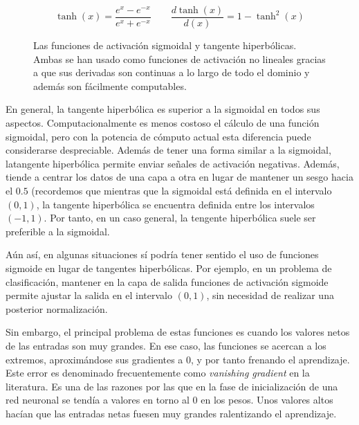 \begin{equation}
\tanh(x) = \frac{e^x - e^{-x}}{e^x+e^{-x}} \qquad
\frac{d\tanh (x)}{d(x)} = 1 - \tanh^2(x)
\label{eq:tanh}
\end{equation}

\begin{figure}[!b]
	\centering
	\qquad
	\caption[Funciones de activación: sigmoide y tangente hiperbólica]{Las funciones de activación sigmoidal y tangente hiperbólicas. Ambas se han usado como funciones de activación no lineales gracias a que sus derivadas son continuas a lo largo de todo el dominio y además son fácilmente computables.}
	\label{fig:sig-and-tanh}
\end{figure}

En general, la tangente hiperbólica es superior a la sigmoidal en todos sus aspectos. Computacionalmente es menos costoso el cálculo de una función sigmoidal, pero con la potencia de cómputo actual esta diferencia puede considerarse despreciable. Además de tener una forma similar a la sigmoidal, latangente hiperbólica permite enviar señales de activación negativas. Además, tiende a centrar los datos de una capa a otra en lugar de mantener un sesgo hacia el $0.5$ (recordemos que mientras que la sigmoidal está definida en el intervalo $(0, 1)$, la tangente hiperbólica se encuentra definida entre los intervalos $(-1, 1)$. Por tanto, en un caso general, la tengente hiperbólica suele ser preferible a la sigmoidal.

Aún así, en algunas situaciones sí podría tener sentido el uso de funciones sigmoide en lugar de tangentes hiperbólicas. Por ejemplo, en un problema de clasificación, mantener en la capa de salida funciones de activación sigmoide permite ajustar la salida en el intervalo $(0, 1)$, sin necesidad de realizar una posterior normalización.

Sin embargo, el principal problema de estas funciones es cuando los valores netos de las entradas son muy grandes. En ese caso, las funciones se acercan a los extremos, aproximándose sus gradientes a 0, y por tanto frenando el aprendizaje. Este error es denominado frecuentemente como \textit{vanishing gradient} en la literatura. Es una de las razones por las que en la fase de inicialización de una red neuronal se tendía a valores en torno al 0 en los pesos. Unos valores altos hacían que las entradas netas fuesen muy grandes ralentizando el aprendizaje.

